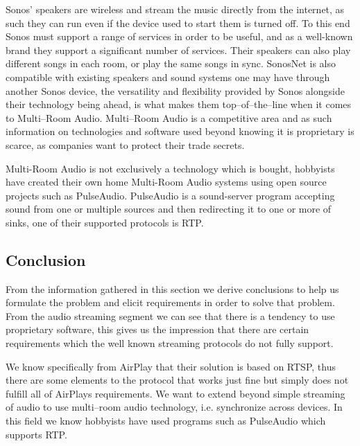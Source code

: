 Sonos' speakers are wireless and stream the music directly from the internet, as such they can run even if the device used to start them is turned off.
To this end Sonos must support a range of services in order to be useful, and as a well-known brand they support a significant number of services.
Their speakers can also play different songs in each room, or play the same songs in sync.
SonosNet is also compatible with existing speakers and sound systems one may have through another Sonos device, the versatility and flexibility provided by Sonos alongside their technology being ahead, is what makes them top--of--the--line when it comes to Multi--Room Audio.\cite{sonos2}
Multi--Room Audio is a competitive area and as such information on technologies and software used beyond knowing it is proprietary is scarce, as companies want to protect their trade secrets.

Multi-Room Audio is not exclusively a technology which is bought, hobbyists have created their own home Multi-Room Audio systems using open source projects such as PulseAudio.\cite{pulseAudioHobbyist}
PulseAudio is a sound-server program accepting sound from one or multiple sources and then redirecting it to one or more of sinks, one of their supported protocols is \ac{RTP}.\cite{pulseAudioModules}


\subsection{Conclusion}
From the information gathered in this section we derive conclusions to help us formulate the problem and elicit requirements in order to solve that problem.
From the audio streaming segment we can see that there is a tendency to use proprietary software, this gives us the impression that there are certain requirements which the well known streaming protocols do not fully support. 

We know specifically from AirPlay that their solution is based on \ac{RTSP}, thus there are some elements to the protocol that works just fine but simply does not fulfill all of AirPlays requirements.
We want to extend beyond simple streaming of audio to use multi--room audio technology, i.e. synchronize across devices.
In this field we know hobbyists have used programs such as PulseAudio which supports \ac{RTP}.

